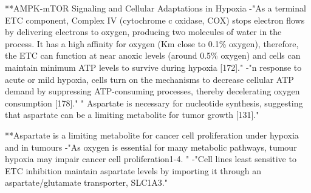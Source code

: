 \documentclass[11pt,a4paper]{article}
\begin{document}
**AMPK-mTOR Signaling and Cellular Adaptations in Hypoxia
-"As a terminal ETC component, Complex IV (cytochrome c oxidase, COX) stops electron flows by delivering electrons to oxygen, producing two molecules of water in the process. It has a high affinity for oxygen (Km close to 0.1\% oxygen), therefore, the ETC can function at near anoxic levels (around 0.5\% oxygen) and cells can maintain minimum ATP levels to survive during hypoxia [172]."
-"n response to acute or mild hypoxia, cells turn on the mechanisms to decrease cellular ATP demand by suppressing ATP-consuming processes, thereby decelerating oxygen consumption [178]."
" Aspartate is necessary for nucleotide synthesis, suggesting that aspartate can be a limiting metabolite for tumor growth [131]."

**Aspartate is a limiting metabolite for cancer cell proliferation under hypoxia and in tumours 
-"As oxygen is essential for many metabolic pathways, tumour hypoxia may impair cancer cell proliferation1-4. "
-"Cell lines least sensitive to ETC inhibition maintain aspartate levels by importing it through an aspartate/glutamate transporter, SLC1A3."
\end{document}
